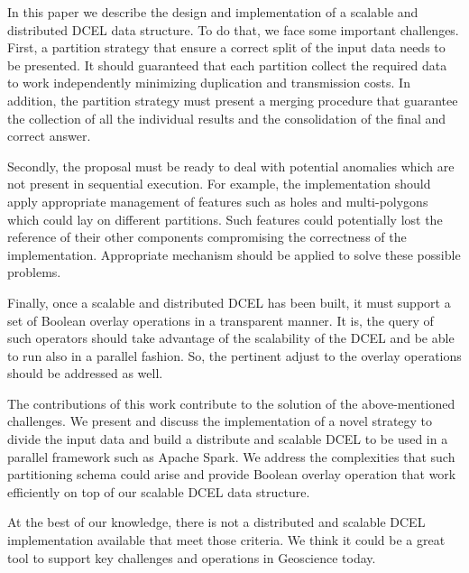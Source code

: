 
In this paper we describe the design and implementation of a scalable and distributed DCEL data structure.  To do that, we face some important challenges.  First, a partition strategy that ensure a correct split of the input data needs to be presented.  It should guaranteed that each partition collect the required data to work independently minimizing duplication and transmission costs.  In addition, the partition strategy must present a merging procedure that guarantee the collection of all the individual results and the consolidation of the final and correct answer.

Secondly, the proposal must be ready to deal with potential anomalies which are not present in sequential execution.  For example, the implementation should apply appropriate management of features such as holes and multi-polygons which could lay on different partitions.  Such features could potentially lost the reference of their other components compromising the correctness of the implementation.  Appropriate mechanism should be applied to solve these possible problems.

Finally, once a scalable and distributed DCEL has been built, it must support a set of Boolean overlay operations in a transparent manner.  It is, the query of such operators should take advantage of the scalability of the DCEL and be able to run also in a parallel fashion.  So, the pertinent adjust to the overlay operations should be addressed as well.

The contributions of this work contribute to the solution of the above-mentioned challenges.  We present and discuss the implementation of a novel strategy to divide the input data and build a distribute and scalable DCEL to be used in a parallel framework such as Apache Spark.  We address the complexities that such partitioning schema could arise and provide Boolean overlay operation that work efficiently on top of our scalable DCEL data structure.

At the best of our knowledge, there is not a distributed and scalable DCEL implementation available that meet those criteria.  We think it could be a great tool to support key  challenges and operations in Geoscience today.  
